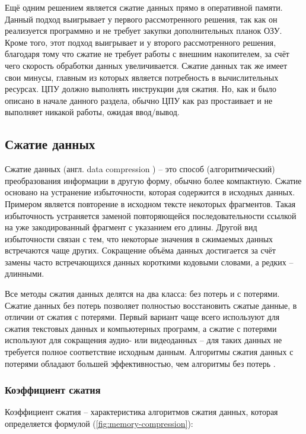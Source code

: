 Ещё одним решением является сжатие данных прямо в оперативной памяти. Данный подход выигрывает у первого рассмотренного решения, так как он реализуется программно и не требует закупки дополнительных планок ОЗУ. Кроме того, этот подход выигрывает и у второго рассмотренного решения, благодаря тому что сжатие не требует работы с внешним накопителем, за счёт чего скорость обработки данных увеличивается. Сжатие данных так же имеет свои минусы, главным из которых является потребность в вычислительных ресурсах. ЦПУ должно выполнять инструкции для сжатия. Но, как и было описано в начале данного раздела, обычно ЦПУ как раз простаивает и не выполняет никакой работы, ожидая ввод/вывод.

\subsection{Сжатие данных}

Сжатие данных (англ. data compression \cite{data-compression}) --  это способ (алгоритмический) преобразования информации в другую форму, обычно более компактную. Сжатие основано на устранение избыточности, которая содержится в исходных данных. Примером является повторение в исходном тексте некоторых фрагментов. Такая избыточность устраняется заменой повторяющейся последовательности ссылкой на уже закодированный фрагмент с указанием его длины. Другой вид избыточности связан с тем, что некоторые значения в сжимаемых данных встречаются чаще других. Сокращение объёма данных достигается за счёт замены часто встречающихся данных короткими кодовыми словами, а редких -- длинными.

Все методы сжатия данных делятся на два класса: без потерь и с потерями. Сжатие данных без потерь позволяет полностью восстановить сжатые данные, в отличии от сжатия с потерями. Первый вариант чаще всего используют для сжатия текстовых данных и компьютерных программ, а сжатие с потерями используют для сокращения аудио- или видеоданных -- для таких данных не требуется полное соответствие исходным данным. Алгоритмы сжатия данных с потерями обладают большей эффективностью, чем алгоритмы без потерь \cite{lossless-compression}.

\subsubsection{Коэффициент сжатия}

Коэффициент сжатия -- характеристика алгоритмов сжатия данных, которая определяется формулой (\ref{fig:memory-compression}): 

